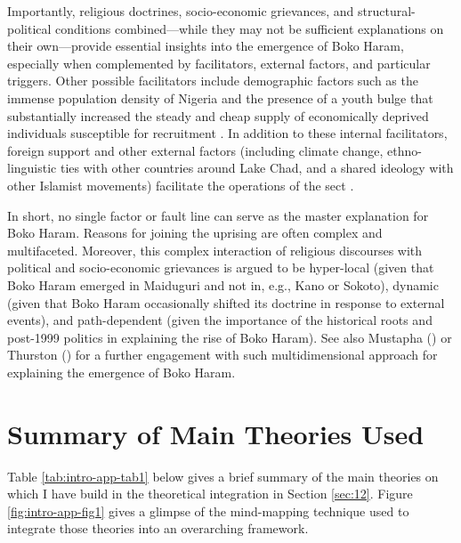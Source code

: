 Importantly, religious doctrines, socio-economic grievances, and structural-political conditions combined—while they may not be sufficient explanations on their own—provide essential insights into the emergence of Boko Haram, especially when complemented by facilitators, external factors, and particular triggers. Other possible facilitators include demographic factors such as the immense population density of Nigeria and the presence of a youth bulge that substantially increased the steady and cheap supply of economically deprived individuals susceptible for recruitment \citep[][for a more extensive engagement with the role of youth bulges in explaining Boko Haram, see also Aghedo \& Eke, \citeyear{Aghedo2013}]{Ostby2014}. In addition to these internal facilitators, foreign support and other external factors (including climate change, ethno-linguistic ties with other countries around Lake Chad, and a shared ideology with other Islamist movements) facilitate the operations of the sect \citep{David2015e,Higazi2015, Lewis2015}.


In short, no single factor or fault line can serve as the master explanation for Boko Haram. Reasons for joining the uprising are often complex and multifaceted. Moreover, this complex interaction of religious discourses with political and socio-economic grievances is argued to be hyper-local (given that Boko Haram emerged in Maiduguri and not in, e.g., Kano or Sokoto), dynamic (given that Boko Haram occasionally shifted its doctrine in response to external events), and path-dependent (given the importance of the historical roots and post-1999 politics in explaining the rise of Boko Haram). See also Mustapha (\citeyear{Mustapha2014}) or Thurston (\citeyear{Thurston2018}) for a further engagement with such multidimensional approach for explaining the emergence of Boko Haram.


\newpage
\section{Summary of Main Theories Used}
\label{app:A2}

Table \ref{tab:intro-app-tab1} below gives a brief summary of the main theories on which I have build in the theoretical integration in Section \ref{sec:12}. Figure \ref{fig:intro-app-fig1} gives a glimpse of the mind-mapping technique used to integrate those theories into an overarching framework.

\newpage

